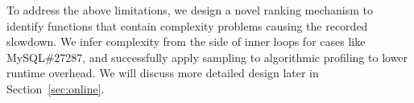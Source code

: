 To address the above limitations, 
we design a novel ranking mechanism to identify 
functions that contain complexity problems causing the recorded slowdown. 
We infer complexity from the side of inner loops 
for cases like MySQL\#27287, 
and successfully apply sampling to algorithmic 
profiling to lower runtime overhead.
We will discuss more detailed design 
later in Section~\ref{sec:online}. 




